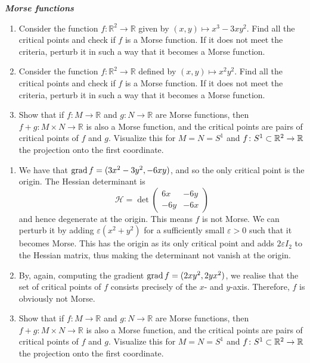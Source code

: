 \begin{exercise} \textbf{\textit{Morse functions}}
	\begin{enumerate}[label=(\alph*)] 
	\item Consider the function \(f: \mathbb{R}^2 \rightarrow \mathbb{R}\) given by \((x,y)\mapsto x^3-3xy^2\). Find all the critical points and check if $f$ is a Morse function. If it does not meet the criteria, perturb it in such a way that it becomes a Morse function.
	\item Consider the function \(f:\mathbb{R}^2 \rightarrow \mathbb{R}\) defined by \((x,y)\mapsto x^2y^2\). Find all the critical points and check if $f$ is a Morse function. If it does not meet the criteria, perturb it in such a way that it becomes a Morse function.
	\item Show that if \(f:M \rightarrow \mathbb{R}\) and \(g: N\rightarrow \mathbb{R}\) are Morse functions, then \(f+g: M\times N \rightarrow \mathbb{R}\) is also a Morse function, and the critical points are pairs of critical points of \(f\) and \(g\). Visualize this for $M=N=S^1$ and $f\colon S^1 \subset \mathbb{R}^2\to \mathbb{R}$ the projection onto the first coordinate. 
\end{enumerate}
\end{exercise}

\begin{enumerate}[label=(\alph*)] 
	\item We have that $\operatorname{grad} f=(3x^2-3y^2,-6xy)$, and so the only critical point is the origin. The Hessian determinant is $$\mathscr{H}=\det \begin{pmatrix}
	    6x & -6y \\ -6y & -6x
	\end{pmatrix}$$ and hence degenerate at the origin. This means $f$ is not Morse. We can perturb it by adding $\varepsilon (x^2+y^2)$ for a sufficiently small $\varepsilon>0$ such that it becomes Morse. This has the origin as its only critical point and adds $2 \varepsilon I_2$ to the Hessian matrix, thus making the determinant not vanish at the origin.

 
	\item By, again, computing the gradient $\operatorname{grad} f=(2xy^2,2yx^2)$, we realise that the set of critical points of $f$ consists precisely of the $x$- and $y$-axis. Therefore, $f$ is obviously not Morse. 
	\item Show that if \(f:M \rightarrow \mathbb{R}\) and \(g: N\rightarrow \mathbb{R}\) are Morse functions, then \(f+g: M\times N \rightarrow \mathbb{R}\) is also a Morse function, and the critical points are pairs of critical points of \(f\) and \(g\). Visualize this for $M=N=S^1$ and $f\colon S^1 \subset \mathbb{R}^2\to \mathbb{R}$ the projection onto the first coordinate. 
\end{enumerate}




